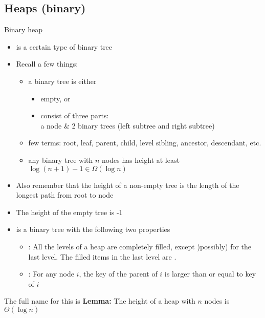 \documentclass[letterpaper, 12pt]{article}
\newcommand{\red}[1]{{\color{red}{#1}}}
\begin{document}
    \subsection{Heaps (binary)}
    Binary heap
    \begin{itemize}
        \item is a certain type of binary tree
        \item Recall a few things:
        \begin{itemize}
            \item a binary tree is either
            \begin{itemize}
                \item empty, or
                \item consist of three parts:\\
                a node \& 2 binary trees (left subtree and right subtree)
            \end{itemize}
            \item few terms: root, leaf, parent, child, level sibling, ancestor, descendant, etc.
            \item any binary tree with $n$ nodes has height at least\\
            $\log(n + 1) - 1 \in \Omega(\log n)$
        \end{itemize}
        \item Also remember that the height of a non-empty tree is the length of the longest path from root to node
        \item The height of the empty tree is -1
    \end{itemize}
    \bigskip
    \red{Heap}
    \begin{itemize}
        \item is a binary tree with the following two properties
        \begin{itemize}
            \item \red{Structural Property}: All the levels of a heap are completely filled, except )possibly) for the last level.
            The filled items in the last level are \red{left-justified}.
            \item \red{Heap-order Property}: For any node $i$, the key of the parent of $i$ is larger than or equal to key of $i$
        \end{itemize}
    \end{itemize}

    The full name for this is \red{max-oriented binary heap}
    \textbf{Lemma:} The height of a heap with $n$ nodes is $\Theta(\log n)$
    \bigskip
\end{document}
